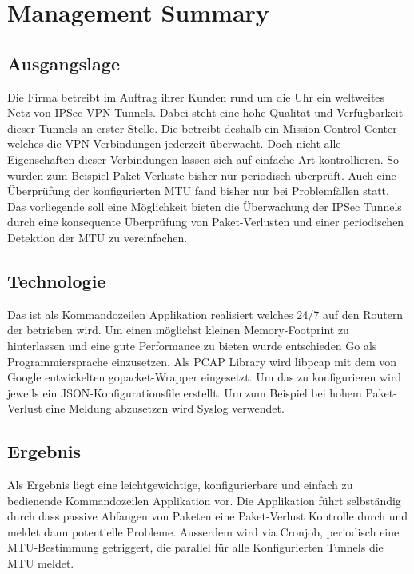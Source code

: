 
\chapter*{Management Summary}

\section*{Ausgangslage}
Die Firma \osag betreibt im Auftrag ihrer Kunden rund um die Uhr ein weltweites Netz von \acs{IPSec} \acs{VPN} Tunnels. Dabei steht eine hohe Qualität und Verfügbarkeit dieser Tunnels an erster Stelle. Die \osag betreibt deshalb ein Mission Control Center welches die \acs{VPN} Verbindungen jederzeit überwacht. Doch nicht alle Eigenschaften dieser Verbindungen lassen sich auf einfache Art kontrollieren. So wurden zum Beispiel Paket-Verluste bisher nur periodisch überprüft. Auch eine Überprüfung der konfigurierten \acs{MTU} fand bisher nur bei Problemfällen statt. Das vorliegende \tool soll eine Möglichkeit bieten die Überwachung der \acs{IPSec} Tunnels durch eine konsequente Überprüfung von Paket-Verlusten und einer periodischen Detektion der \acs{MTU} zu vereinfachen.

\section*{Technologie}
Das \tool ist als Kommandozeilen Applikation realisiert welches 24/7 auf den Routern der \osag betrieben wird. Um einen möglichst kleinen Memory-Footprint zu hinterlassen und eine gute Performance zu bieten wurde entschieden Go als Programmiersprache einzusetzen. Als \acs{PCAP} Library wird libpcap mit dem von Google entwickelten gopacket-Wrapper eingesetzt. Um das \tool zu konfigurieren wird jeweils ein JSON-Konfigurationsfile erstellt. Um zum Beispiel bei hohem Paket-Verlust eine Meldung abzusetzen wird Syslog verwendet.

\section*{Ergebnis}
Als Ergebnis liegt eine leichtgewichtige, konfigurierbare und einfach zu bedienende Kommandozeilen Applikation vor. Die Applikation führt selbständig durch dass passive Abfangen von Paketen eine Paket-Verlust Kontrolle durch und meldet dann potentielle Probleme. Ausserdem wird via Cronjob, periodisch eine \acs{MTU}-Bestimmung getriggert, die parallel für alle Konfigurierten Tunnels die \acs{MTU} meldet.

